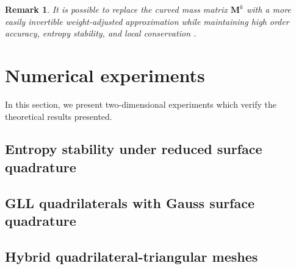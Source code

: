 \documentclass[review]{siamart0216}
\newtheorem*{remark}{Remark}
\theoremstyle{assumption}
\newcommand{\note}[1]{{\color{blue}{#1}}}
\begin{document}
\begin{remark}
It is possible to replace the curved mass matrix $\bm{M}^k$ with a more easily invertible weight-adjusted approximation while maintaining high order accuracy, entropy stability, and local conservation \cite{chan2018discretely}.  
\end{remark}


\section{Numerical experiments}

In this section, we present two-dimensional experiments which verify the theoretical results presented.  %

\subsection{Entropy stability under reduced surface quadrature}

\note{Affine and curved triangles with GLL surface quadrature (under-integrated).}

\subsection{GLL quadrilaterals with Gauss surface quadrature}

\note{Explain that for GLL quadratures, the decoupled SBP property doesn't hold when Gauss points are used.  }

\subsection{Hybrid quadrilateral-triangular meshes}


%
%
%



\end{document}
